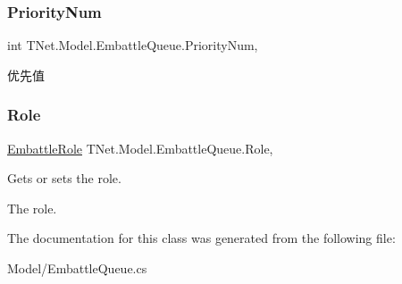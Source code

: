 \subsubsection{\texorpdfstring{Priority\+Num}{PriorityNum}}
{\footnotesize\ttfamily int T\+Net.\+Model.\+Embattle\+Queue.\+Priority\+Num\hspace{0.3cm}{\ttfamily [get]}, {\ttfamily [set]}}



优先值 

\mbox{\label{class_t_net_1_1_model_1_1_embattle_queue_a5a8c80a0311eaa84762f04b6fca79bfb}} 
\subsubsection{\texorpdfstring{Role}{Role}}
{\footnotesize\ttfamily \mbox{\hyperlink{namespace_t_net_1_1_model_a33d7abaa523c3472da9f2084152b79d3}{Embattle\+Role}} T\+Net.\+Model.\+Embattle\+Queue.\+Role\hspace{0.3cm}{\ttfamily [get]}, {\ttfamily [set]}}



Gets or sets the role. 

The role.

The documentation for this class was generated from the following file\+:\begin{DoxyCompactItemize}
\item 
Model/Embattle\+Queue.\+cs\end{DoxyCompactItemize}

